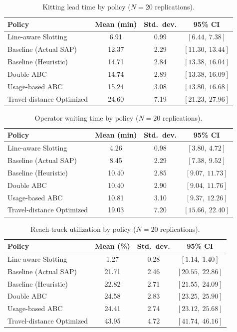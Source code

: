 \documentclass[conference]{IEEEtran}
\begin{document}
\begin{table}[htbp]
\centering
\caption{Kitting lead time by policy ($N=20$ replications).}
\label{tab:lead}
\begin{tabular}{lccc}
\toprule
Policy & Mean (min) & Std.\ dev. & 95\% CI \\
\midrule
Line-aware Slotting & 6.91 & 0.99 & $[6.44,\ 7.38]$ \\
Baseline (Actual SAP) & 12.37 & 2.29 & $[11.30,\ 13.44]$ \\
Baseline (Heuristic) & 14.71 & 2.84 & $[13.38,\ 16.04]$ \\
Double ABC & 14.74 & 2.89 & $[13.38,\ 16.09]$ \\
Usage-based ABC & 15.24 & 3.08 & $[13.80,\ 16.68]$ \\
Travel-distance Optimized & 24.60 & 7.19 & $[21.23,\ 27.96]$ \\
\bottomrule
\end{tabular}
\end{table}

\begin{table}[htbp]
\centering
\caption{Operator waiting time by policy ($N=20$ replications).}
\label{tab:wait}
\begin{tabular}{lccc}
\toprule
Policy & Mean (min) & Std.\ dev. & 95\% CI \\
\midrule
Line-aware Slotting & 4.26 & 0.98 & $[3.80,\ 4.72]$ \\
Baseline (Actual SAP) & 8.45 & 2.29 & $[7.38,\ 9.52]$ \\
Baseline (Heuristic) & 10.40 & 2.85 & $[9.07,\ 11.73]$ \\
Double ABC & 10.40 & 2.90 & $[9.04,\ 11.76]$ \\
Usage-based ABC & 10.81 & 3.10 & $[9.37,\ 12.26]$ \\
Travel-distance Optimized & 19.03 & 7.20 & $[15.66,\ 22.40]$ \\
\bottomrule
\end{tabular}
\end{table}

\begin{table}[htbp]
\centering
\caption{Reach-truck utilization by policy ($N=20$ replications).}
\label{tab:util}
\begin{tabular}{lccc}
\toprule
Policy & Mean (\%) & Std.\ dev. & 95\% CI \\
\midrule
Line-aware Slotting & 1.27 & 0.28 & $[1.14,\ 1.40]$ \\
Baseline (Actual SAP) & 21.71 & 2.46 & $[20.55,\ 22.86]$ \\
Baseline (Heuristic) & 22.82 & 2.71 & $[21.55,\ 24.09]$ \\
Double ABC & 24.58 & 2.83 & $[23.25,\ 25.90]$ \\
Usage-based ABC & 24.41 & 2.74 & $[23.12,\ 25.68]$ \\
Travel-distance Optimized & 43.95 & 4.72 & $[41.74,\ 46.16]$ \\
\bottomrule
\end{tabular}
\end{table}
\end{document}
